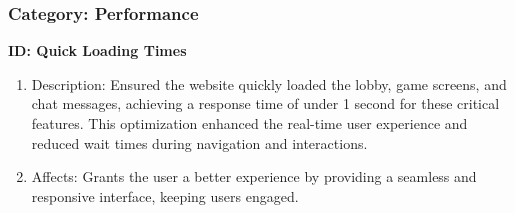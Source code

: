 \subsubsection{Category: Performance}
\textbf{ID: Quick Loading Times}
\begin{enumerate}
    \item Description: Ensured the website quickly loaded the lobby, game screens, and chat messages, achieving a response time of under 1 second for these critical features. This optimization enhanced the real-time user experience and reduced wait times during navigation and interactions.
    \item Affects: Grants the user a better experience by providing a seamless and responsive interface, keeping users engaged.
\end{enumerate}
